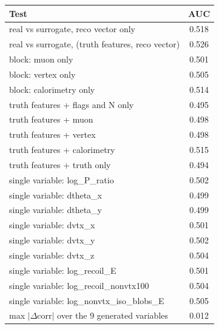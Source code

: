 \begin{tabular}{lc}
\toprule
Test & AUC \\
\midrule
real vs surrogate, reco vector only & 0.518 \\
real vs surrogate, (truth features, reco vector) & 0.526 \\
\midrule
block: muon only & 0.501 \\
block: vertex only & 0.505 \\
block: calorimetry only & 0.514 \\
truth features + flags and N only & 0.495 \\
truth features + muon & 0.498 \\
truth features + vertex & 0.498 \\
truth features + calorimetry & 0.515 \\
truth features + truth only & 0.494 \\
single variable: log\_P\_ratio & 0.502 \\
single variable: dtheta\_x & 0.499 \\
single variable: dtheta\_y & 0.499 \\
single variable: dvtx\_x & 0.501 \\
single variable: dvtx\_y & 0.502 \\
single variable: dvtx\_z & 0.504 \\
single variable: log\_recoil\_E & 0.501 \\
single variable: log\_recoil\_nonvtx100 & 0.504 \\
single variable: log\_nonvtx\_iso\_blobs\_E & 0.505 \\
\midrule
max $|\Delta$corr$|$ over the 9 generated variables & 0.012 \\
\bottomrule
\end{tabular}
